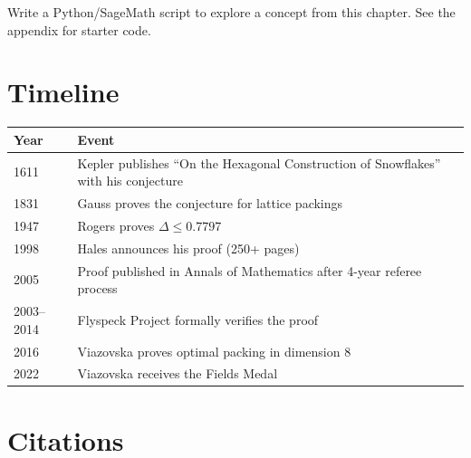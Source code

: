 \begin{exercise}[Computational]
Write a Python/SageMath script to explore a concept from this chapter. See the appendix for starter code.
\end{exercise}

\section{Timeline}

\begin{tabularx}{\linewidth}{lX}
\toprule
\textbf{Year} & \textbf{Event} \\ \midrule
1611 & Kepler publishes ``On the Hexagonal Construction of Snowflakes'' with his conjecture \\ 
1831 & Gauss proves the conjecture for lattice packings \cite{gauss1831} \\ 
1947 & Rogers proves $\Delta \leq 0.7797$ \cite{rogers1947} \\ 
1998 & Hales announces his proof (250+ pages) \cite{hales2005} \\ 
2005 & Proof published in Annals of Mathematics after 4-year referee process \cite{hales2005} \\ 
2003--2014 & Flyspeck Project formally verifies the proof \cite{hales2017} \\ 
2016 & Viazovska proves optimal packing in dimension 8 \cite{viazovska2017} \\ 
2022 & Viazovska receives the Fields Medal \\ \bottomrule
\end{tabularx}

\section{Citations}

